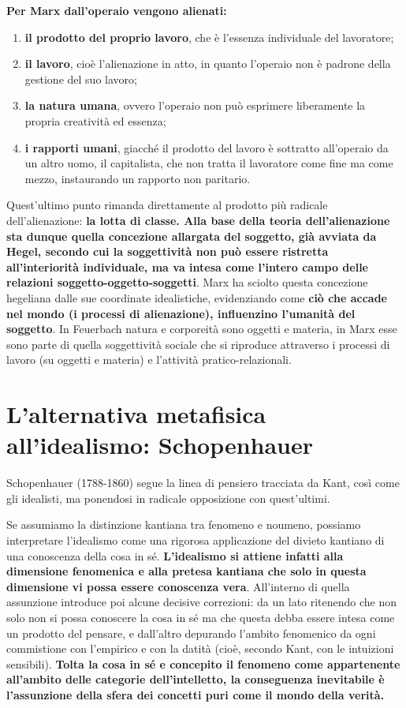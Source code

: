  \textbf{Per Marx dall'operaio vengono alienati:}
 
 \begin{enumerate}
 	\item \textbf{il prodotto del proprio lavoro}, che è l'essenza individuale del lavoratore;
 	\item \textbf{il lavoro}, cioè l'alienazione in atto, in quanto l'operaio non è padrone della gestione del suo lavoro;
 	\item \textbf{la natura umana}, ovvero l'operaio non può esprimere liberamente la propria creatività ed essenza;
 	\item \textbf{i rapporti umani}, giacché il prodotto del lavoro è sottratto all'operaio da un altro uomo, il capitalista, che non tratta il lavoratore come fine ma come mezzo, instaurando un rapporto non paritario.
 \end{enumerate}

Quest'ultimo punto rimanda direttamente al prodotto più radicale dell'alienazione: \textbf{la lotta di classe. Alla base della teoria dell'alienazione sta dunque quella concezione allargata del soggetto, già avviata da Hegel, secondo cui la soggettività non può essere ristretta all'interiorità individuale, ma va intesa come l'intero campo delle relazioni soggetto-oggetto-soggetti}. Marx ha sciolto questa concezione hegeliana dalle sue coordinate idealistiche, evidenziando come \textbf{ciò che accade nel mondo (i processi di alienazione), influenzino l'umanità del soggetto}. In Feuerbach natura e corporeità sono oggetti e materia, in Marx esse sono parte di quella soggettività sociale che si riproduce attraverso i processi di lavoro (su oggetti e materia) e l'attività pratico-relazionali.

\section{L'alternativa metafisica all'idealismo: Schopenhauer}

Schopenhauer (1788-1860) segue la linea di pensiero tracciata da Kant, così come gli idealisti, ma ponendosi in radicale opposizione con quest'ultimi.

Se assumiamo la distinzione kantiana tra fenomeno e noumeno, possiamo interpretare l'idealismo come una rigorosa applicazione del divieto kantiano di una conoscenza della cosa in sé. \textbf{L'idealismo si attiene infatti alla dimensione fenomenica e alla pretesa kantiana che solo in questa dimensione vi possa essere conoscenza vera}. All’interno di quella assunzione introduce poi alcune decisive correzioni: da un lato ritenendo che non solo non si possa conoscere la cosa in sé ma che questa debba essere intesa come un prodotto del pensare, e dall’altro depurando l’ambito fenomenico da ogni commistione con l’empirico e con la datità (cioè, secondo Kant, con le intuizioni sensibili). \textbf{Tolta la cosa in sé e concepito il fenomeno come appartenente all’ambito delle categorie dell’intelletto, la conseguenza inevitabile è l’assunzione della sfera dei concetti puri come il mondo della verità.}

